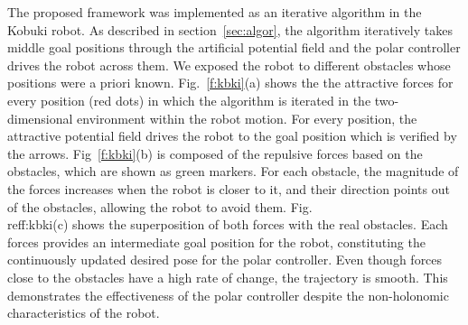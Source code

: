 \documentclass[conference]{IEEEtran}
\begin{document}
The proposed framework was implemented as an iterative algorithm in the Kobuki
robot. As described in section~\ref{sec:algor}, the algorithm iteratively takes
middle goal positions through the artificial potential field and the polar
controller drives the robot across them. We exposed the robot to different
obstacles whose positions were a priori known.
Fig.~\ref{f:kbki}(a) shows the the attractive forces for every position (red
dots) in which the algorithm is iterated in the two-dimensional environment
within the robot motion. For every position, the attractive potential field
drives the robot to the goal position which is verified by the arrows.
Fig~\ref{f:kbki}(b) is composed of the repulsive forces based on the obstacles,
which are shown as green markers.
For each obstacle, the magnitude of the forces increases when the robot is
closer to it, and their direction points out of the obstacles, allowing the
robot to avoid them. Fig.~\\ref{f:kbki}(c) shows the superposition of both
forces with the real obstacles. Each forces provides an intermediate goal
position for the robot, constituting the continuously updated desired pose for
the polar controller. Even though forces close to the obstacles have a high
rate of change, the trajectory is smooth. This demonstrates the effectiveness of
the polar controller despite the non-holonomic characteristics of the robot.
\end{document}

